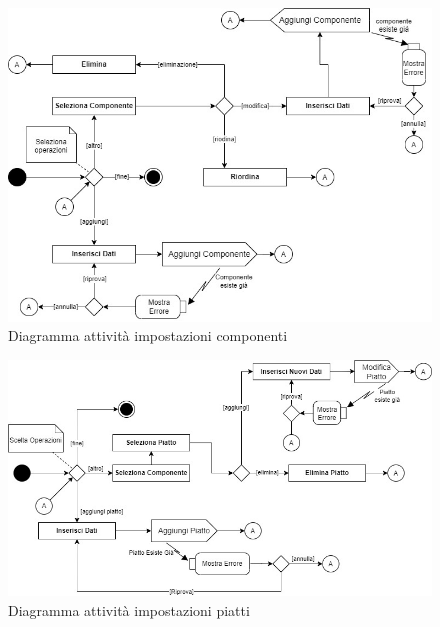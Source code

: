\documentclass[12pt, letterpaper]{book}
\begin{document}
\begin{figure}[H]
    \centering
    \includegraphics[width =0.9 \linewidth]{../UML/DrawIo/Activity/Activity-ImpostazioniComponenti.jpg}
    \caption{Diagramma attività impostazioni componenti}
    \label{UM: A-ImpostazioniComponenti}
\end{figure}
\begin{figure}[H]
    \centering
    \includegraphics[width =1 \linewidth]{../UML/DrawIo/Activity/Activity-ImpostazioniPiatti.jpg}
    \caption{Diagramma attività impostazioni piatti}
    \label{UM: A-ImpostazioniPiatti}
\end{figure}


\newpage
\end{document}
